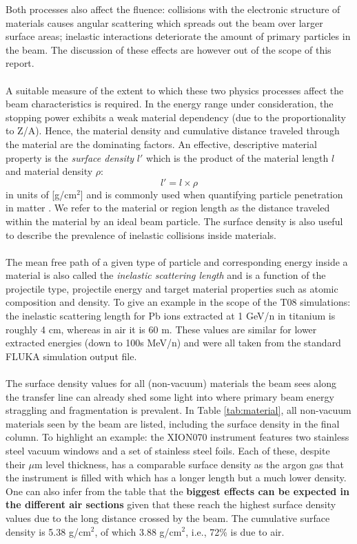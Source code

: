 Both processes also affect the fluence: collisions with the electronic structure of materials causes angular scattering which spreads out the beam over larger surface areas; inelastic interactions deteriorate the amount of primary particles in the beam. The discussion of these effects are however out of the scope of this report.\\
\\
A suitable measure of the extent to which these two physics processes affect the beam characteristics is required. In the energy range under consideration, the stopping power exhibits a weak material dependency (due to the proportionality to Z/A). Hence, the material density and cumulative distance traveled through the material are the dominating factors. An effective, descriptive material property is the \emph{surface density} $l'$ which is the product of the material length $l$ and material density $\rho$:
\begin{equation}
l' = l \times \rho
\end{equation}
in units of [g/cm$^2$] and is commonly used when quantifying particle penetration in matter \cite{Lechner18}. We refer to the material or region length as the distance traveled within the material by an ideal beam particle. The surface density is also useful to describe the prevalence of inelastic collisions inside materials.\\
\\
The mean free path of a given type of particle and corresponding energy inside a material is also called the \emph{inelastic scattering length} and is a function of the projectile type, projectile energy and target material properties such as atomic composition and density. To give an example in the scope of the T08 simulations: the inelastic scattering length for Pb ions extracted at 1 GeV/n in titanium is roughly 4 cm, whereas in air it is 60 m. These values are similar for lower extracted energies (down to 100s MeV/n) and were all taken from the standard FLUKA simulation output file.\\
\\
 The surface density values for all (non-vacuum) materials the beam sees along the transfer line can already shed some light into where primary beam energy straggling and fragmentation is prevalent. In Table \ref{tab:material}, all non-vacuum materials seen by the beam are listed, including the surface density in the final column. To highlight an example: the XION070 instrument features two stainless steel vacuum windows and a set of stainless steel foils. Each of these, despite their $\mu$m level thickness, has a comparable surface density as the argon gas that the instrument is filled with which has a longer length but a much lower density. One can also infer from the table that the \textbf{biggest effects can be expected in the different air sections} given that these reach the highest surface density values due to the long distance crossed by the beam. The cumulative surface density is 5.38 g/cm$^2$, of which 3.88  g/cm$^2$, i.e., 72\% is due to air. \\
